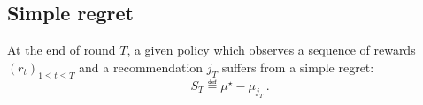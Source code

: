\subsection{Simple regret}\label{sec:mab.performance.simple}

\begin{definition}\label{def:stoch_mab.simple_regret}
\begin{leftbar}[defnbar]
	At the end of round $T$, a given policy which observes a sequence of rewards $(r_t)_{1 \leq t \leq T}$ and a recommendation $j_T$ suffers from a simple regret:
	\[
		S_T \eqdef \mu^{\star} - \mu_{j_T}\,.
	\]
\end{leftbar}
\end{definition}